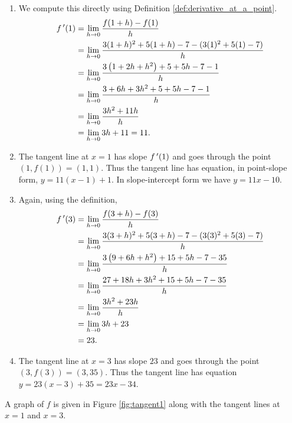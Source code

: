 {	\begin{enumerate}
	\item		We compute this directly using Definition \ref{def:derivative_at_a_point}.
					\begin{align*}
						\fp(1) &=	\lim_{h\to 0} \frac{f(1+h)-f(1)}{h} \\
										&=	\lim_{h\to 0} \frac{3(1+h)^2+5(1+h)-7 - (3(1)^2+5(1)-7)}{h}\\
										&=	\lim_{h\to 0} \frac{3\left(1+2h+h^2\right)+5+5h-7 - 1}{h}\\
										&=	\lim_{h\to 0} \frac{3+6h+3h^2+5+5h-7 - 1}{h}\\
										&=	\lim_{h\to 0} \frac{3h^2+11h}{h}\\
										&= 	\lim_{h\to 0}	3h+11=11.%
					\end{align*}
	\item		The tangent line at $x=1$ has slope $f\,'(1)$ and goes through the point $(1,f(1)) = (1,1)$. Thus the tangent line has equation, in point-slope form, $y = 11(x-1) + 1$. In slope-intercept form we have $y = 11x-10$.
	
	\item		Again, using the definition,
					\begin{align*}
					f\,'(3) &=	\lim_{h\to 0} \frac{f(3+h)-f(3)}{h} \\
									&=	\lim_{h\to 0} \frac{3(3+h)^2+5(3+h)-7 - (3(3)^2+5(3)-7)}{h} \\
									&=	\lim_{h\to 0} \frac{3\left(9+6h+h^2\right)+15+5h-7 - 35}{h} \\
									&=	\lim_{h\to 0} \frac{27+18h+3h^2+15+5h-7 - 35}{h} \\
									&=	\lim_{h\to 0} \frac{3h^2+23h}{h}\\
									&= \lim_{h\to 0} 3h+23 \\
									&= 23.
					\end{align*}
	
	\item		The tangent line at $x=3$ has slope $23$ and goes through the point $(3,f(3)) = (3,35)$. Thus the tangent line has equation $y=23(x-3)+35 = 23x-34$.
		\end{enumerate}


A graph of $f$ is given in Figure \ref{fig:tangent1} along with the tangent lines at $x=1$ and $x=3$.
}\\

